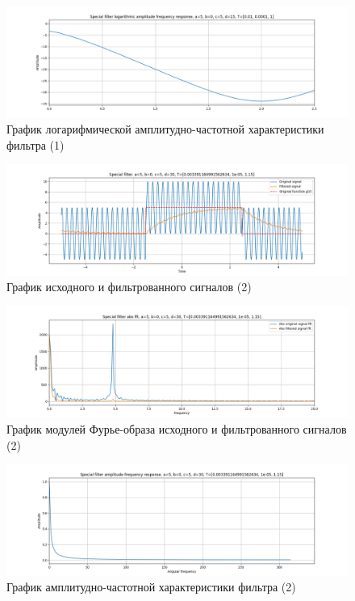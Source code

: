\documentclass[a4paper, 12pt]{article}
\begin{document}
    \begin{figure}[H]
        \centering
        \includegraphics[scale=0.4]{1_fl2_lafr.png}
        \captionsetup{skip=0pt}
        \caption{График логарифмической амплитудно-частотной характеристики фильтра (1)}
        \label{fig:filinlafr21}
    \end{figure}
    \begin{figure}[H]
        \centering
        \includegraphics[scale=0.4]{2_fl2.png}
        \captionsetup{skip=0pt}
        \caption{График исходного и фильтрованного сигналов (2)}
        \label{fig:filin22}
    \end{figure}
    \begin{figure}[H]
        \centering
        \includegraphics[scale=0.4]{2_fl2_abs.png}
        \captionsetup{skip=0pt}
        \caption{График модулей Фурье-образа исходного и фильтрованного сигналов (2)}
        \label{fig:filinabs22}
    \end{figure}
    \begin{figure}[H]
        \centering
        \includegraphics[scale=0.4]{2_fl2_afr.png}
        \captionsetup{skip=0pt}
        \caption{График амплитудно-частотной характеристики фильтра (2)}
        \label{fig:filinafr22}
    \end{figure}
\end{document}
